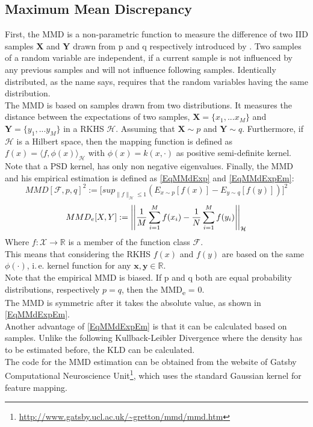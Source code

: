 \subsection{Maximum Mean Discrepancy}\label{TlSubSecMMD}
First, the \acl{MMD} is a non-parametric function to measure the difference of two \ac{IID} samples $\mathbf{X}$ and $\mathbf{Y}$ drawn from p and q respectively introduced by \cite[p. 724-728]{Gretton.2012}.
Two samples of a random variable are independent, if a current sample is not influenced by any previous samples and will not influence following samples.
Identically  distributed, as the name says, requires that the random variables having the same distribution.\cite[p. 7-8]{Czado.2011}\\
The \acs{MMD} is based on samples drawn from two distributions.
It measures the distance between the expectations of two samples, $\textbf{X}=\{x_1,...x_M\}$ and $\textbf{Y}=\{y_1,...y_M\}$
in a \ac{RKHS} $\mathcal{H}$.
Assuming that $\mathbf{X} \sim p$ and $\mathbf{Y} \sim q$.
Furthermore, if $\mathcal{H}$ is a Hilbert space, then the mapping function is defined as $f(x) = \langle f,\phi(x) \rangle_\mathcal{H}$ with $\phi(x) = k(x,\cdot)$ as positive semi-definite kernel.
Note that a \ac{PSD} kernel, has only non negative eigenvalues.\cite[p. 30]{Scholkopf.2001}
Finally, the \acs{MMD} and his empirical estimation is defined as \eqref{EqMMdExp} and \eqref{EqMMdExpEm}:\cite[p. 726-727]{Gretton.2012}
\begin{equation}\label{EqMMdExp}
MMD[\mathcal{F},p,q]^2:=\big[sup_{\|f\|_\mathcal{H} \le 1 }(E_{x\sim p}[f(x)] - E_{y\sim q}[f(y)])\big]^2
\end{equation}
\begin{equation}\label{EqMMdExpEm}
MMD_e[X,Y]:= \left\vert\left\vert\frac{1}{M}\sum_{i=1}^{M}f(x_i) - \frac{1}{N}\sum_{i=1}^{M}f(y_i)\right\vert\right\vert_{\mathcal{H}}
\end{equation}
Where $f:\mathcal{X} \to \mathbb{R}$ is a member of the function class $\mathcal{F}$.\\ This means that considering the \acs{RKHS} $f(x)$ and $f(y)$ are based on the same $\phi(\cdot)$, i.\,e. kernel function for any $\mathbf{x,y} \in \mathbb{R}$.\cite[p. 36]{Scholkopf.2001}\\
Note that the empirical \acs{MMD} is biased.
If p and q both are equal probability distributions, respectively $p = q$, then the \ac{MMD}\textsubscript{e} = 0.\cite[p. 726-727]{Gretton.2012}\\
The \acs{MMD} is symmetric after it takes the absolute value, as shown in \eqref{EqMMdExpEm}.\\
Another advantage of \eqref{EqMMdExpEm} is that it can be calculated based on samples.
Unlike the following Kullback-Leibler Divergence where the density has to be estimated before, the \acs{KLD} can be calculated.\cite{Long.2015}\\
The code for the \acs{MMD} estimation can be obtained from the website of Gatsby Computational Neuroscience Unit\footnote{\url{http://www.gatsby.ucl.ac.uk/~gretton/mmd/mmd.htm}}, which uses the standard Gaussian kernel for feature mapping.

